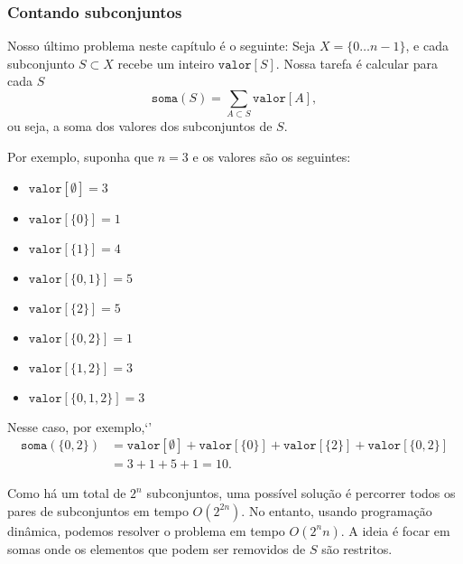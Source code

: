 \subsubsection{Contando subconjuntos}

Nosso último problema neste capítulo é o seguinte:
Seja $X=\{0 \ldots n-1\}$, e cada subconjunto $S \subset X$
recebe um inteiro $\texttt{valor}[S]$.
Nossa tarefa é calcular para cada $S$
\[\texttt{soma}(S) = \sum_{A \subset S} \texttt{valor}[A],\]
ou seja, a soma dos valores dos subconjuntos de $S$.

Por exemplo, suponha que $n=3$ e os valores são os seguintes:
\begin{multicols}{2}
\begin{itemize}
\item $\texttt{valor}[\emptyset] = 3$
\item $\texttt{valor}[\{0\}] = 1$
\item $\texttt{valor}[\{1\}] = 4$
\item $\texttt{valor}[\{0,1\}] = 5$
\item $\texttt{valor}[\{2\}] = 5$
\item $\texttt{valor}[\{0,2\}] = 1$
\item $\texttt{valor}[\{1,2\}] = 3$
\item $\texttt{valor}[\{0,1,2\}] = 3$
\end{itemize}
\end{multicols}
Nesse caso, por exemplo,`'
\begin{equation*}
\begin{split}
\texttt{soma}(\{0,2\}) &= \texttt{valor}[\emptyset]+\texttt{valor}[\{0\}]+\texttt{valor}[\{2\}]+\texttt{valor}[\{0,2\}] \\ 
                      &= 3 + 1 + 5 + 1 = 10.
\end{split}
\end{equation*}

Como há um total de $2^n$ subconjuntos,
uma possível solução é percorrer todos
os pares de subconjuntos em tempo $O(2^{2n})$.
No entanto, usando programação dinâmica, podemos
resolver o problema em tempo $O(2^n n)$.
A ideia é focar em somas onde os
elementos que podem ser removidos de $S$ são restritos.

